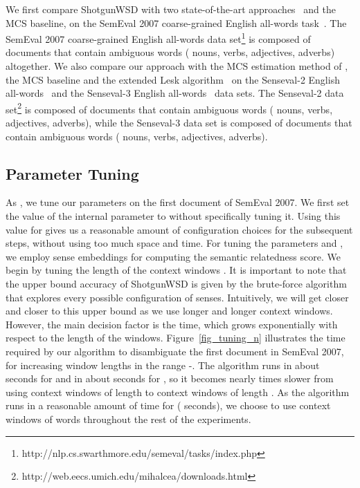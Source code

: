 \documentclass[11pt]{article}
\makeatletter
\newcommand\footnoteref[1]{\protected@xdef\@thefnmark{\ref{#1}}\@footnotemark}
\makeatother
\begin{document}
We first compare ShotgunWSD with two state-of-the-art approaches~\cite{Schwab-WET-2013,Chen-EMNLP-2014} and the MCS baseline, on the SemEval 2007 coarse-grained English all-words task~\cite{SemEval-task7-2007}. The SemEval 2007 coarse-grained English all-words data set\footnote{http://nlp.cs.swarthmore.edu/semeval/tasks/index.php} is composed of  documents that contain  ambiguous words ( nouns,  verbs,  adjectives,  adverbs) altogether. We also compare our approach with the MCS estimation method of , the MCS baseline and the extended Lesk algorithm~\cite{Torres-Lesk-2009} on the Senseval-2 English all-words~\cite{Senseval2-2001} and the Senseval-3 English all-words~\cite{Senseval3-2004} data sets. The Senseval-2 data set\footnote{\label{note1}http://web.eecs.umich.edu/mihalcea/downloads.html} is composed of  documents that contain  ambiguous words ( nouns,  verbs,  adjectives,  adverbs), while the Senseval-3 data set\footnoteref{note1} is composed of  documents that contain  ambiguous words ( nouns,  verbs,  adjectives,  adverbs).

\subsection{Parameter Tuning}

As , we tune our parameters on the first document of SemEval 2007. We first set the value of the internal parameter  to  without specifically tuning it. Using this value for  gives us a reasonable amount of configuration choices for the subsequent steps, without using too much space and time. For tuning the parameters  and , we employ sense embeddings for computing the semantic relatedness score. We begin by tuning the length of the context windows . It is important to note that the upper bound accuracy of ShotgunWSD is given by the brute-force algorithm that explores every possible configuration of senses. Intuitively, we will get closer and closer to this upper bound as we use longer and longer context windows. However, the main decision factor is the time, which grows exponentially with respect to the length of the windows. Figure~\ref{fig_tuning_n} illustrates the time required by our algorithm to disambiguate the first document in SemEval 2007, for increasing window lengths in the range -. The algorithm runs in about  seconds for  and in about  seconds for , so it becomes nearly  times slower from using context windows of length  to context windows of length . As the algorithm runs in a reasonable amount of time for  ( seconds), we choose to use context windows of  words throughout the rest of the experiments.
\end{document}
